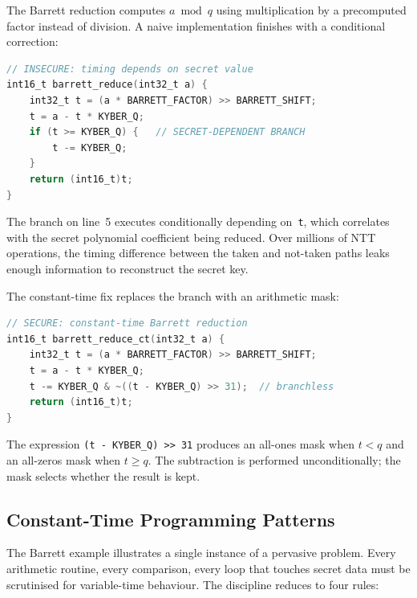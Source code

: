 \begin{example}
\label{ex:barrett-timing}
The Barrett reduction computes $a \bmod q$ using multiplication by a precomputed factor instead of division.  A naive implementation finishes with a conditional correction:
\begin{lstlisting}[language=C]
// INSECURE: timing depends on secret value
int16_t barrett_reduce(int32_t a) {
    int32_t t = (a * BARRETT_FACTOR) >> BARRETT_SHIFT;
    t = a - t * KYBER_Q;
    if (t >= KYBER_Q) {   // SECRET-DEPENDENT BRANCH
        t -= KYBER_Q;
    }
    return (int16_t)t;
}
\end{lstlisting}
The branch on line~5 executes conditionally depending on~\texttt{t}, which correlates with the secret polynomial coefficient being reduced.  Over millions of NTT operations, the timing difference between the taken and not-taken paths leaks enough information to reconstruct the secret key.
\end{example}

The constant-time fix replaces the branch with an arithmetic mask:

\begin{lstlisting}[language=C]
// SECURE: constant-time Barrett reduction
int16_t barrett_reduce_ct(int32_t a) {
    int32_t t = (a * BARRETT_FACTOR) >> BARRETT_SHIFT;
    t = a - t * KYBER_Q;
    t -= KYBER_Q & ~((t - KYBER_Q) >> 31);  // branchless
    return (int16_t)t;
}
\end{lstlisting}

The expression \texttt{(t - KYBER\_Q) >> 31} produces an all-ones mask when $t < q$ and an all-zeros mask when $t \geq q$.  The subtraction is performed unconditionally; the mask selects whether the result is kept.

\subsection{Constant-Time Programming Patterns}
\label{subsec:ct-patterns}

The Barrett example illustrates a single instance of a pervasive problem.  Every arithmetic routine, every comparison, every loop that touches secret data must be scrutinised for variable-time behaviour.  The discipline reduces to four rules:

